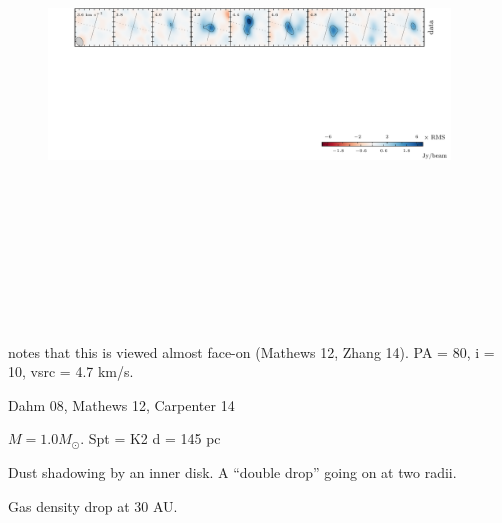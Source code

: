 \documentclass[twocolumn]{aastex6}
\begin{document}
\begin{figure}[htb]
\begin{center}
  \includegraphics[draft, width=0.95\textwidth, height=5in]{RXJ1604.pdf}
  \end{center}
\end{figure}

\citep{vandermarel15} notes that this is viewed almost face-on (Mathews 12, Zhang 14). PA = 80, i = 10, vsrc = 4.7 km/s.

Dahm 08, Mathews 12, Carpenter 14

$M = 1.0 M_\odot$.
Spt = K2
d = 145 pc

Dust shadowing by an inner disk. A ``double drop'' going on at two radii.

Gas density drop at 30 AU.
\end{document}
